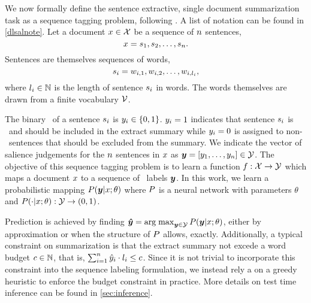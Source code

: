 We now formally define the sentence extractive, single document summarization 
task as a sequence tagging problem, following \cite{conroy2001}. A 
list of notation can be found in \autoref{dlsalnote}. Let a 
document $x\in \mathcal{X}$ be a sequence of $n$ sentences, 
\[ x = s_1, s_2, \ldots, s_n.\] 
Sentences are themselves sequences of words,
\[s_i=w_{i,1}, w_{i,2}, \ldots, w_{i,{l_i}},\]
where $l_i\in\mathbb{N}$ is the length of sentence $s_i$ in words.
The words themselves are drawn from a finite vocabulary $\mathcal{V}$.

The binary \salience~of a sentence $s_i$ is $y_i \in\{0,1\}$. $y_i=1$ indicates that sentence $s_i$ is \salient~and
should be included in the extract summary while $y_i=0$ is assigned
to non-\salient~sentences that should be excluded from the summary.
We indicate the vector of salience judgements for the $n$ 
sentences in $x$ as $\boldsymbol{y} = \left[y_1,\ldots,y_n\right]\in  \mathcal{Y}$.
The objective of this sequence tagging problem is to learn a function
$f : \mathcal{X} \rightarrow \mathcal{Y}$ which maps a document $x$ to a 
sequence of \salience~labels $\boldsymbol{y}$. In this work, we learn a probabilistic
mapping $P(\boldsymbol{y}|x;\theta)$ where $P$ is a neural network with parameters
$\theta$ and $P(\cdot|x;\theta) : \mathcal{Y} \rightarrow (0,1)$. 









Prediction is achieved by finding 
$\boldsymbol{\hat{y}} = \operatorname{arg\;max}_{\boldsymbol{y} \in \mathcal{Y}} P(\boldsymbol{y}|x;\theta)$, either by approximation or when the structure of $P$ allows, exactly.
Additionally, a typical constraint on summarization is that the 
extract summary not excede a word budget $c \in \mathbb{N}$, that is, $\sum_{i=1}^n \hat{y}_i \cdot l_i \le c$.
Since it is not trivial to incorporate this constraint into the sequence
labeling formulation, we instead rely a on a greedy heuristic to enforce the
budget constraint in practice. More details on test time inference 
can be found in \autoref{sec:inference}.



